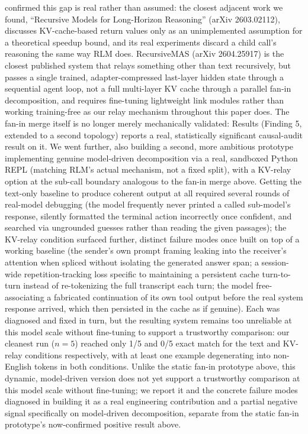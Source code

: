 \documentclass[11pt]{article}
\begin{document}
confirmed this gap is real rather than assumed: the closest adjacent work
we found, ``Recursive Models for Long-Horizon Reasoning'' (arXiv
2603.02112), discusses KV-cache-based return values only as an
unimplemented assumption for a theoretical speedup bound, and its real
experiments discard a child call's reasoning the same way RLM does.
RecursiveMAS (arXiv 2604.25917) is the closest published system that
relays something other than text recursively, but passes a single
trained, adapter-compressed last-layer hidden state through a sequential
agent loop, not a full multi-layer KV cache through a parallel fan-in
decomposition, and requires fine-tuning lightweight link modules rather
than working training-free as our relay mechanism throughout this paper
does. The fan-in merge itself is no longer merely mechanically validated:
Results (Finding 5, extended to a second topology) reports a real,
statistically significant causal-audit result on it. We went further,
also building a second, more ambitious prototype implementing genuine
model-driven decomposition via a real, sandboxed Python REPL (matching
RLM's actual mechanism, not a fixed split), with a KV-relay option at the
sub-call boundary analogous to the fan-in merge above. Getting the
text-only baseline to produce coherent output at all required several
rounds of real-model debugging (the model frequently never printed a
called sub-model's response, silently formatted the terminal action
incorrectly once confident, and searched via ungrounded guesses rather
than reading the given passages); the KV-relay condition surfaced
further, distinct failure modes once built on top of a working baseline
(the sender's own prompt framing leaking into the receiver's attention
when spliced without isolating the generated answer span; a session-wide
repetition-tracking loss specific to maintaining a persistent cache
turn-to-turn instead of re-tokenizing the full transcript each turn; the
model free-associating a fabricated continuation of its own tool output
before the real system response arrived, which then persisted in the
cache as if genuine). Each was diagnosed and fixed in turn, but the
resulting system remains too unreliable at this model scale without
fine-tuning to support a trustworthy comparison: our cleanest run ($n=5$)
reached only 1/5 and 0/5 exact match for the text and KV-relay conditions
respectively, with at least one example degenerating into non-English
tokens in both conditions. Unlike the static fan-in prototype above, this
dynamic, model-driven version does not yet support a trustworthy
comparison at this model scale without fine-tuning; we report it and the
concrete failure modes diagnosed in building it as a real engineering
contribution and a partial negative signal specifically on model-driven
decomposition, separate from the static fan-in prototype's now-confirmed
positive result above.
\end{document}
